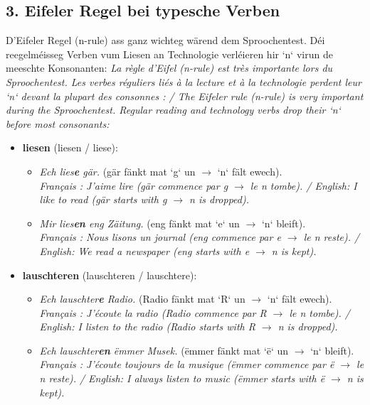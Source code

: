\subsection*{3. Eifeler Regel bei typesche Verben}
D'Eifeler Regel (n-rule) ass ganz wichteg wärend dem Sproochentest. Déi reegelméisseg Verben vum Liesen an Technologie verléieren hir `n` virun de meeschte Konsonanten:
\textit{La règle d'Eifel (n-rule) est très importante lors du Sproochentest. Les verbes réguliers liés à la lecture et à la technologie perdent leur `n` devant la plupart des consonnes : / The Eifeler rule (n-rule) is very important during the Sproochentest. Regular reading and technology verbs drop their `n` before most consonants:}
\begin{itemize}
    \item \textbf{liesen} (liesen / liese):
    \begin{itemize}
        \item \textit{Ech lies\textbf{e} gär.} (gär fänkt mat `g` un $\rightarrow$ `n` fält ewech). \\
        \textit{Français : J'aime lire (gär commence par g $\rightarrow$ le n tombe). / English: I like to read (gär starts with g $\rightarrow$ n is dropped).}
        \item \textit{Mir lies\textbf{en} eng Zäitung.} (eng fänkt mat `e` un $\rightarrow$ `n` bleift). \\
        \textit{Français : Nous lisons un journal (eng commence par e $\rightarrow$ le n reste). / English: We read a newspaper (eng starts with e $\rightarrow$ n is kept).}
    \end{itemize}
    \item \textbf{lauschteren} (lauschteren / lauschtere):
    \begin{itemize}
        \item \textit{Ech lauschter\textbf{e} Radio.} (Radio fänkt mat `R` un $\rightarrow$ `n` fält ewech). \\
        \textit{Français : J'écoute la radio (Radio commence par R $\rightarrow$ le n tombe). / English: I listen to the radio (Radio starts with R $\rightarrow$ n is dropped).}
        \item \textit{Ech lauschter\textbf{en} ëmmer Musek.} (ëmmer fänkt mat `ë` un $\rightarrow$ `n` bleift). \\
        \textit{Français : J'écoute toujours de la musique (ëmmer commence par ë $\rightarrow$ le n reste). / English: I always listen to music (ëmmer starts with ë $\rightarrow$ n is kept).}
    \end{itemize}

\end{itemize}
